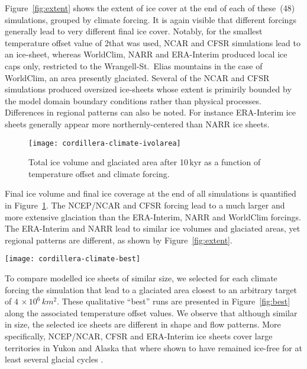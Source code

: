 Figure~\ref{fig:extent} shows the extent of ice cover at the end of each of these~(48) simulations, grouped by climate forcing. It is again visible that different forcings generally lead to very different final ice cover. Notably, for the smallest temperature offset value of 2\degC that was used, NCAR and CFSR simulations lead to an ice-sheet, whereas WorldClim, NARR and ERA-Interim produced local ice caps only, restricted to the Wrangell-St.~Elias mountains in the case of WorldClim, an area presently glaciated. Several of the NCAR and CFSR simulations produced oversized ice-sheets whose extent is primirily bounded by the model domain boundary conditions rather than physical processes. Differences in regional patterns can also be noted. For instance ERA-Interim ice sheets generally appear more northernly-centered than NARR ice sheets.

\begin{figure}[t]
	\vspace*{2mm}
	\begin{center}
		\texttt{[image: cordillera-climate-ivolarea]}
	\end{center}
	\caption{Total ice volume and glaciated area after 10\,kyr as a function of temperature offset and climate forcing.}
	\label{fig:ivolarea}
\end{figure}

Final ice volume and final ice coverage at the end of all simulations is quantified in Figure~\ref{fig:ivolarea}. The NCEP/NCAR and CFSR forcing lead to a much larger and more extensive glaciation than the ERA-Interim, NARR and WorldClim forcings. The ERA-Interim and NARR lead to similar ice volumes and glaciated areas, yet regional patterns are different, as shown by Figure~\ref{fig:extent}.

\begin{figure*}[t]
	\vspace*{2mm}
	\begin{center}
		\texttt{[image: cordillera-climate-best]}
	\end{center}
	\caption{Ice surface topography (black contours every 1000\,m) and velocity (\unit{m\,yr^{-1}}) after 10\,kyr using temperature offsets that lead to similar areas of ice cover for each climate forcing.}
	\label{fig:best}
\end{figure*}

To compare modelled ice sheets of similar size, we selected for each climate forcing the simulation that lead to a glaciated area closest to an arbitrary target of $4\,\times10^6\,\unit{km^2}$. These qualitative ``best'' runs are presented in Figure~\ref{fig:best} along the associated temperature offset values. We observe that although similar in size, the selected ice sheets are different in shape and flow patterns. More specifically, NCEP/NCAR, CFSR and ERA-Interim ice sheets cover large territories in Yukon and Alaska that where shown to have remained ice-free for at least several glacial cycles \citep{dukrodkin-1999,kaufman-manley-2004}.

